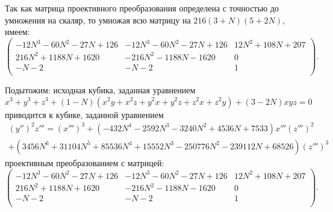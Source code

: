 \documentclass[a4paper,12pt]{article}
\theoremstyle{definition}
\begin{document}
    Так как матрица проективного преобразования определена с точностью до
    умножения на скаляр, то умножая всю матрицу на \(216 (3 + N) (5 + 2 N)\),
    имеем:
    \[
    \begin{pmatrix}
        -12 N^3 - 60 N^2 - 27 N + 126 &  -12 N^3 - 60 N^2 - 27 N + 126 &
        12 N^2 + 108 N + 207 \\
        216 N^2 + 1188 N + 1620 &  -216 N^2 - 1188 N - 1620 & 0 \\
        -N - 2 &  -N - 2 & 1 \\
    \end{pmatrix}
    .\] 
    
    \bigskip
    \bigskip

    \noindent Подытожим: исходная кубика, заданная уравнением
    \[
    x^3 + y^3 + z^3 + (1 - N) (x^2 y + x^2 z + y^2 x + y^2 z + z^2 x + z^2 y) +
    (3 - 2 N) x y z = 0
    \] 
    приводится к кубике, заданной уравнением
    \begin{multline*}
        \left( y'' \right)^2 z''' = \left( x''' \right)^3  +  \left(-432 N^4
        - 2592 N^3 - 3240 N^2 + 4536 N + 7533\right) x''' \left( z'''
        \right)^2 \\ 
        +  \left(3456 N^6 + 31104 N^5 + 85536 N^4 + 15552 N^3 -
        250776 N^2 - 239112 N + 68526 \right) \left( z''' \right)^3
    \end{multline*}
    проективным преобразованием с матрицей:
    \[
    \begin{pmatrix}
        -12 N^3 - 60 N^2 - 27 N + 126 &  -12 N^3 - 60 N^2 - 27 N + 126 &
        12 N^2 + 108 N + 207 \\
        216 N^2 + 1188 N + 1620 &  -216 N^2 - 1188 N - 1620 & 0 \\
        -N - 2 &  -N - 2 & 1 \\
    \end{pmatrix}
    .\] 

    
\end{document}
